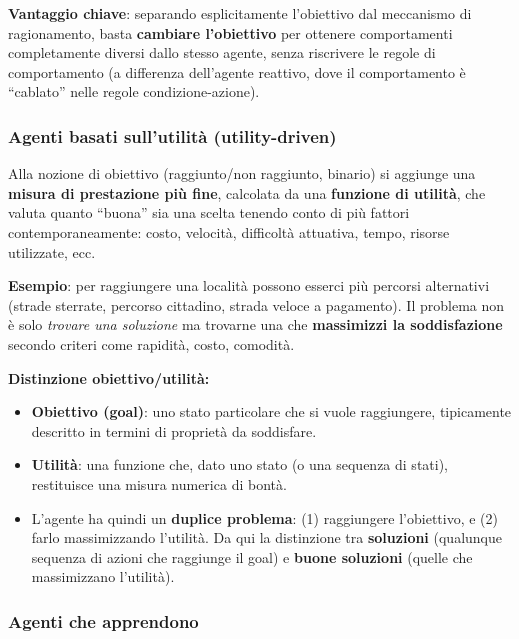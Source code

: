 \documentclass[11pt,a4paper]{report}
\begin{document}
\textbf{Vantaggio chiave}: separando esplicitamente l'obiettivo dal meccanismo di ragionamento, basta \textbf{cambiare l'obiettivo} per ottenere comportamenti completamente diversi dallo stesso agente, senza riscrivere le regole di comportamento (a differenza dell'agente reattivo, dove il comportamento è ``cablato'' nelle regole condizione-azione).

\subsubsection*{Agenti basati sull'utilità (utility-driven)}

Alla nozione di obiettivo (raggiunto/non raggiunto, binario) si aggiunge una \textbf{misura di prestazione più fine}, calcolata da una \textbf{funzione di utilità}, che valuta quanto ``buona'' sia una scelta tenendo conto di più fattori contemporaneamente: costo, velocità, difficoltà attuativa, tempo, risorse utilizzate, ecc.

\textbf{Esempio}: per raggiungere una località possono esserci più percorsi alternativi (strade sterrate, percorso cittadino, strada veloce a pagamento). Il problema non è solo \emph{trovare una soluzione} ma trovarne una che \textbf{massimizzi la soddisfazione} secondo criteri come rapidità, costo, comodità.

\textbf{Distinzione obiettivo/utilità:}
\begin{itemize}
  \item \textbf{Obiettivo (goal)}: uno stato particolare che si vuole raggiungere, tipicamente descritto in termini di proprietà da soddisfare.
  \item \textbf{Utilità}: una funzione che, dato uno stato (o una sequenza di stati), restituisce una misura numerica di bontà.
  \item L'agente ha quindi un \textbf{duplice problema}: (1) raggiungere l'obiettivo, e (2) farlo massimizzando l'utilità. Da qui la distinzione tra \textbf{soluzioni} (qualunque sequenza di azioni che raggiunge il goal) e \textbf{buone soluzioni} (quelle che massimizzano l'utilità).
\end{itemize}

\subsubsection*{Agenti che apprendono}
\end{document}
